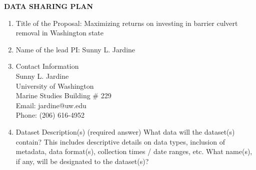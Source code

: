 \documentclass[12pt]{elsarticle}
\begin{document}
\begin{center} \textbf{DATA SHARING PLAN} \end{center}

\begin{enumerate}

\item	Title of the Proposal: Maximizing returns on investing in barrier culvert removal in Washington state\\

\item	Name of the lead PI: Sunny L. Jardine\\

\item		Contact Information\\

Sunny L. Jardine\\ University of Washington\\ Marine Studies Building \# 229\\ Email: jardine@uw.edu\\ Phone: (206) 616-4952\\

\item		Dataset Description(s) (required answer)
What data will the dataset(s) contain? This includes descriptive details on data types, inclusion of metadata, data format(s), collection times / date ranges, etc. What name(s), if any, will be designated to the dataset(s)?


\end{enumerate}
\end{document}
